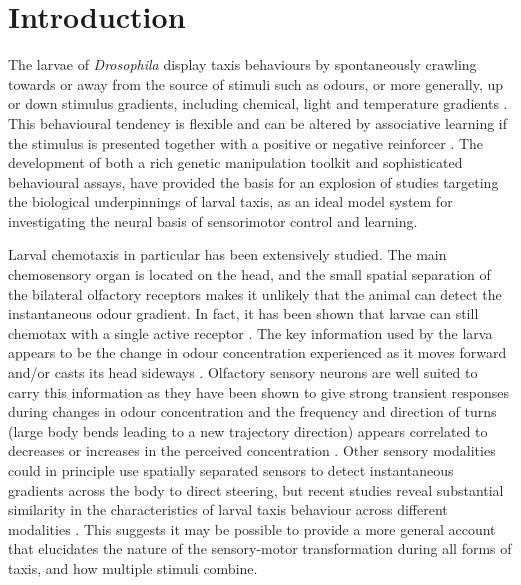 \documentclass[11pt,a4paper]{article}
\newcommand{\Dros }{\emph{Drosophila }}
\newcommand{\todoBW}[1]{\todo[author=BW,color=orange, size=\tiny,inline]{1}}
\begin{document}
\section{Introduction}
The larvae of \Dros display taxis behaviours by spontaneously crawling towards or away from the source of stimuli such as odours, or more generally, up or down stimulus gradients, including chemical, light and temperature gradients \citep{luo2010navigational,gomez2011active,gomez2012active,gomez2014multilevel,kane2013sensorimotor,klein2015sensory}. This behavioural tendency is flexible and can be altered by associative learning if the stimulus is presented together with a positive or negative reinforcer \citep{ache2005olfaction,scherer2003olfactory,gerber2004engram,diegelmann2013maggot,schleyer2015learning}. The development of both a rich genetic manipulation toolkit and sophisticated behavioural assays, \citep{gerber2009smelling,diegelmann2013maggot} 
\todoBW{additional citations needed} 
have provided the basis for an explosion of studies targeting the biological underpinnings of larval taxis, as an ideal model system for investigating the neural basis of sensorimotor control and learning.

Larval chemotaxis in particular has been extensively studied. The main chemosensory organ is located on the head, and the small spatial separation of the bilateral olfactory receptors makes it unlikely that the animal can detect the instantaneous odour gradient. In fact, it has been shown that larvae can still chemotax with a single active receptor  \citep{fishilevich2005chemotaxis,gomez2010mechanisms,louis2008bilateral}. The key information used by the larva  appears to be the change in odour concentration experienced as it moves forward and/or casts its head sideways \citep{gomez2010mechanisms}. 
Olfactory sensory neurons are well suited to carry this information as they have been shown to give strong transient responses during changes in odour concentration \citep{de2013common,nagel2011biophysical,kim2011system,schulze2015dynamical} and the frequency and direction of turns (large body bends leading to a new trajectory direction) appears correlated to  decreases or increases in the perceived concentration \citep{hernandez2015reverse,schulze2015dynamical}. 
  Other sensory modalities could in principle use spatially separated sensors to detect instantaneous gradients across the body to direct steering, but recent studies reveal substantial similarity in the characteristics of larval taxis behaviour across different modalities \citep{gepner2015computations, bellmann2010optogenetically, lahiri2011two}. This suggests it may be possible to provide a more general account that elucidates the nature of the sensory-motor transformation during all forms of taxis, and how multiple stimuli combine. 
\end{document}
